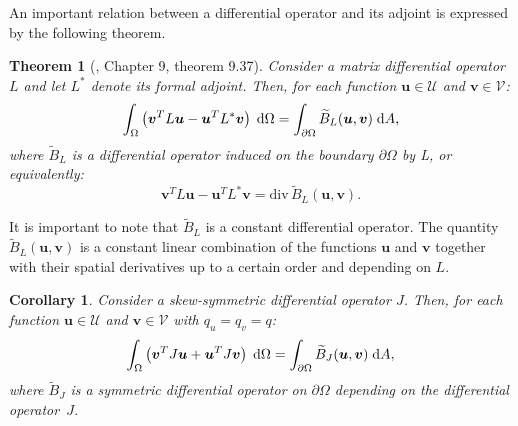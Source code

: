 \documentclass[11t]{article}
\newtheorem{theorem}{Theorem}
\newtheorem{corollary}{Corollary}
\begin{document}
{		An important relation between a differential operator and
		its adjoint is expressed by the following theorem.
		\begin{theorem}[\cite{PDE}, Chapter 9, theorem 9.37]
			Consider a matrix differential operator $L$ and let $L^*$ denote its formal adjoint. Then, for each function $\bm{u} \in \mathcal{U}$ and $\bm{v} \in \mathcal{V}$:
			\begin{equation}
			\int_{\Omega} \left( \bm{v}^T L \bm{u} - \bm{u}^T L^* \bm{v}\right) \d\Omega= \int_{\partial \Omega} \widetilde{B}_L(\bm{u}, \bm{v}) \d{A},
			\end{equation}
			where $\widetilde{B}_L$ is a differential operator induced on the boundary $\partial\Omega$ by L, or equivalently:
			\begin{equation}
			\bm{v}^T L \bm{u} - \bm{u}^T L^* \bm{v} = \mathrm{div} \, \widetilde{B}_L(\bm{u}, \bm{v}).
			\end{equation}
		\end{theorem}
		It is important to note that $\widetilde{B}_L$ is a constant differential operator. The quantity $\widetilde{B}_L(\bm{u}, \bm{v})$ is a constant linear combination of the functions $\bm{u}$ and $\bm{v}$ together with their spatial derivatives up to a certain order and depending on $L$.
		\begin{corollary}
			Consider a skew-symmetric differential operator $J$. Then, for each function $\bm{u} \in \mathcal{U}$ and $\bm{v} \in \mathcal{V}$ with $q_u = q_v = q$:
			\begin{equation}
			\int_{\Omega} \left( \bm{v}^T J \bm{u} + \bm{u}^T J \bm{v}\right) \d\Omega= \int_{\partial \Omega} \widetilde{B}_J(\bm{u}, \bm{v}) \d{A},
			\end{equation}
			where $\widetilde{B}_J$ is a symmetric differential operator on $\partial\Omega$ depending on the differential operator~$J$.
		\end{corollary}
}
\end{document}
